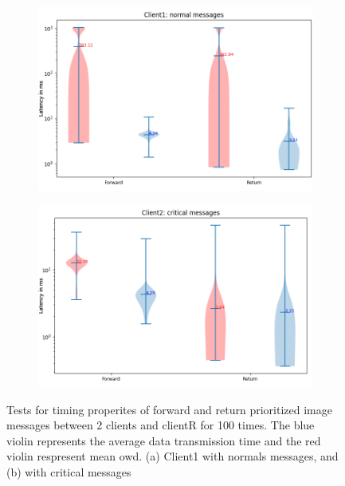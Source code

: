 \begin{figure}[h]
    \centering
    \begin{subfigure}[b]{0.6\textwidth}
    \includegraphics[width=\textwidth]{figures/appendix/priority_tests/log_violin_2clients_image_priority_client1.png}\hfill 
    \caption{} \label{fig: priority-2clients-image-1}
    \end{subfigure}
    \begin{subfigure}[b]{0.6\textwidth}
        \includegraphics[width=\textwidth]{figures/appendix/priority_tests/log_violin_2clients_image_priority_client2.png}\hfill 
        \caption{} \label{fig: priority-2clients-image-2}
    \end{subfigure}
    
    
    \caption{Tests for timing properites of forward and return prioritized image messages between 2 clients 
    and clientR for 100 times. The blue violin represents the average data transmission time and the red violin 
    respresent mean \gls{owd}. (a) Client1 with normals messages, and (b) 
    with critical messages} \label{fig: priority-2clients-image}
\end{figure}



